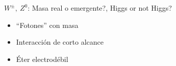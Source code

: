 \documentclass[%
xcolor=pdftex,dvipsnames,table%
]{beamer}
\begin{document}
{
\begin{frame}{$W^\pm,\ Z^0$: Masa real o \alert{emergente}?, \alert{Higgs} or not Higgs?}
\qquad
\vspace{6cm}
\begin{itemize}
\item ``Fotones'' con masa
\item Interacción de corto alcance
\item Éter electrodébil
\end{itemize}
\end{frame}
}
\end{document}
